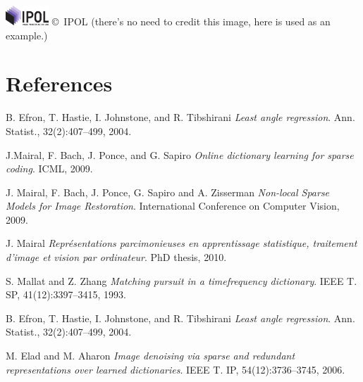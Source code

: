 \documentclass{ipol}
\begin{document}
\includegraphics[height=2em]{ipol_logo} \copyright\ IPOL (there's no
need to credit this image, here is used as an example.)

\section{References}

\begin{thebibliography}{9}

	B. Efron, T. Hastie, I. Johnstone, and R. Tibshirani
	\emph{Least angle regression}. 
	Ann. Statist.,
	32(2):407–499,
	2004.

	J.Mairal, F. Bach, J. Ponce, and G. Sapiro
	\emph{Online dictionary learning for sparse coding}.
	ICML,
	2009.

	J. Mairal, F. Bach, J. Ponce, G. Sapiro and A. Zisserman
	\emph{ Non-local Sparse Models for Image Restoration}.
	International Conference on Computer Vision,
	2009.

	J. Mairal
	\emph{ Représentations parcimonieuses en apprentissage statistique, traitement d’image et
vision par ordinateur}.
	PhD thesis,
	2010.

	S. Mallat and Z. Zhang
 	\emph{Matching pursuit in a timefrequency dictionary}.
	IEEE T. SP,
	41(12):3397–3415,
	1993.

	B. Efron, T. Hastie, I. Johnstone, and R. Tibshirani
	\emph{ Least angle regression}.
	Ann. Statist.,
	32(2):407–499,
	2004.

	M. Elad and M. Aharon
	\emph{Image denoising via sparse and redundant representations over learned dictionaries}.
	IEEE T.
	IP, 54(12):3736–3745,
	2006.

\end{thebibliography}
\end{document}
